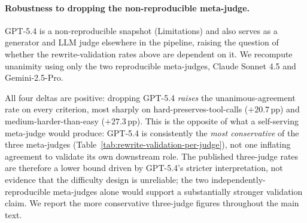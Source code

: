 \paragraph{Robustness to dropping the non-reproducible meta-judge.}
GPT-5.4 is a non-reproducible snapshot (Limitations) and also serves as a generator and LLM judge elsewhere in the pipeline, raising the question of whether the rewrite-validation rates above are dependent on it. We recompute unanimity using only the two reproducible meta-judges, Claude Sonnet 4.5 and Gemini-2.5-Pro.

\begin{table}[h!]
\centering
\small
\setlength{\tabcolsep}{4pt}
\renewcommand{\arraystretch}{1.1}
\caption{Unanimous-agreement rate on each rewrite-validation criterion, Claude Sonnet 4.5 + Gemini-2.5-Pro only ($n=198$), versus the published three-meta-judge rate. $\Delta = $ 2-judge $-$ 3-judge.}
\label{tab:rewrite-validation-no-gpt54}
\end{table}

All four deltas are positive: dropping GPT-5.4 \emph{raises} the unanimous-agreement rate on every criterion, most sharply on hard-preserves-tool-calls ($+20.7$\,pp) and medium-harder-than-easy ($+27.3$\,pp). This is the opposite of what a self-serving meta-judge would produce: GPT-5.4 is consistently the \emph{most conservative} of the three meta-judges (Table~\ref{tab:rewrite-validation-per-judge}), not one inflating agreement to validate its own downstream role. The published three-judge rates are therefore a lower bound driven by GPT-5.4's stricter interpretation, not evidence that the difficulty design is unreliable; the two independently-reproducible meta-judges alone would support a substantially stronger validation claim. We report the more conservative three-judge figures throughout the main text.

